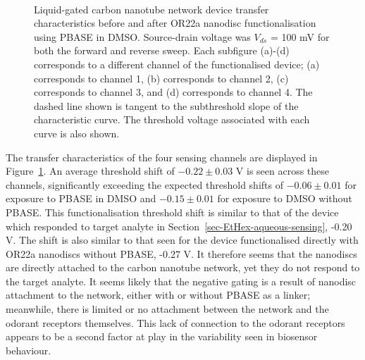 \documentclass[
  a4paper,
]{scrbook}
\begin{document}
\begin{figure}
\begin{minipage}[t]{0.45\linewidth}
{{}

}

\end{minipage}%
%
\begin{minipage}[t]{0.01\linewidth}

{\centering 

~

}

\end{minipage}%

\caption{\label{fig-DMSO-TX}Liquid-gated carbon nanotube network device
transfer characteristics before and after OR22a nanodisc
functionalisation using PBASE in DMSO. Source-drain voltage was
\(V_{ds}\) = 100 mV for both the forward and reverse sweep. Each
subfigure (a)-(d) corresponds to a different channel of the
functionalised device; (a) corresponds to channel 1, (b) corresponds to
channel 2, (c) corresponds to channel 3, and (d) corresponds to channel
4. The dashed line shown is tangent to the subthreshold slope of the
characteristic curve. The threshold voltage associated with each curve
is also shown.}

\end{figure}

The transfer characteristics of the four sensing channels are displayed
in Figure~\ref{fig-DMSO-TX}. An average threshold shift of
\(-0.22\pm0.03\) V is seen across these channels, significantly
exceeding the expected threshold shifts of \(-0.06\pm0.01\) for exposure
to PBASE in DMSO and \(-0.15\pm0.01\) for exposure to DMSO without
PBASE. This functionalisation threshold shift is similar to that of the
device which responded to target analyte in
Section~\ref{sec-EtHex-aqueous-sensing}, -0.20 V. The shift is also
similar to that seen for the device functionalised directly with OR22a
nanodiscs without PBASE, -0.27 V. It therefore seems that the nanodiscs
are directly attached to the carbon nanotube network, yet they do not
respond to the target analyte. It seems likely that the negative gating
is a result of nanodisc attachment to the network, either with or
without PBASE as a linker; meanwhile, there is limited or no attachment
between the network and the odorant receptors themselves. This lack of
connection to the odorant receptors appears to be a second factor at
play in the variability seen in biosensor behaviour.
\end{document}
